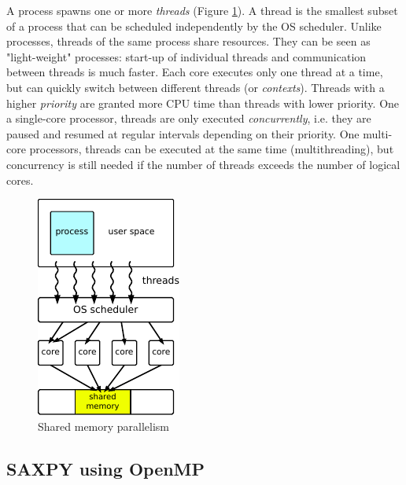 A process spawns one or more \emph{threads} (Figure \ref{fig:shared}). A thread is the smallest subset of a process that can be scheduled independently by the OS scheduler. Unlike processes, threads of the same process share resources. They can be seen as "light-weight" processes: start-up of individual threads and communication between threads is much faster. Each core executes only  one thread at a time, but can quickly switch between different threads (or \emph{contexts}). Threads with a higher \emph{priority} are granted more CPU time than threads with lower priority. One a single-core processor, threads are only executed \emph{concurrently}, i.e. they are paused and resumed at regular intervals depending on their priority. One multi-core processors, threads can be executed at the same time (multithreading), but concurrency is still needed if the number of threads exceeds the number of logical cores.

\begin{figure}[h]
\centering
\includegraphics[scale=1.4]{Pics/shared}
\caption{Shared memory parallelism}
\label{fig:shared}
\end{figure}

\subsection{SAXPY using OpenMP}

